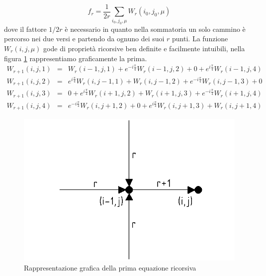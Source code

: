 \documentclass[11pt]{article}
\begin{document}
 $$ f_r=\frac{1}{2r}\sum_{i_0,j_0,\mu}W_r(i_0,j_0,\mu)
 $$
dove il fattore $1/2r$ è necessario in quanto nella sommatoria un solo cammino è percorso nei due versi e partendo da ognuno dei suoi $r$ punti. 
La funzione $W_r(i,j,\mu)$ gode di proprietà ricorsive ben definite e facilmente intuibili, nella figura \ref{v7} rappresentiamo graficamente la prima.
\begin{equation}
\begin{aligned}
W_{r+1}(i,j,1) & = & W_r(i-1,j,1)+e^{-i\frac{\pi}{4}}W_r(i-1,j,2)+0+e^{i\frac{\pi}{4}}W_r(i-1,j,4) \\
W_{r+1}(i,j,2) & = & e^{i\frac{\pi}{4}}W_r(i,j-1,1)+W_r(i,j-1,2)+e^{-i\frac{\pi}{4}}W_r(i,j-1,3)+0 \\
W_{r+1}(i,j,3) & = & 0+e^{i\frac{\pi}{4}}W_r(i+1,j,2)+W_r(i+1,j,3)+e^{-i\frac{\pi}{4}}W_r(i+1,j,4) \\
W_{r+1}(i,j,4) & = & e^{-i\frac{\pi}{4}}W_r(i,j+1,2)+0+e^{i\frac{\pi}{4}}W_r(i,j+1,3)+W_r(i,j+1,4)
\end{aligned} 
\end{equation}
\begin{figure}[h]
\centering
\includegraphics[width=0.7\columnwidth]{v7}
\caption{Rappresentazione grafica della prima equazione ricorsiva}
\label{v7}
\end{figure}
\end{document}
